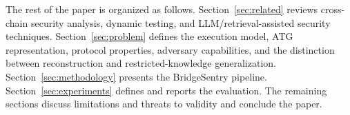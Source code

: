 The rest of the paper is organized as follows. Section~\ref{sec:related} reviews cross-chain security analysis, dynamic testing, and LLM/retrieval-assisted security techniques. Section~\ref{sec:problem} defines the execution model, ATG representation, protocol properties, adversary capabilities, and the distinction between reconstruction and restricted-knowledge generalization. Section~\ref{sec:methodology} presents the BridgeSentry pipeline. Section~\ref{sec:experiments} defines and reports the evaluation. The remaining sections discuss limitations and threats to validity and conclude the paper.
